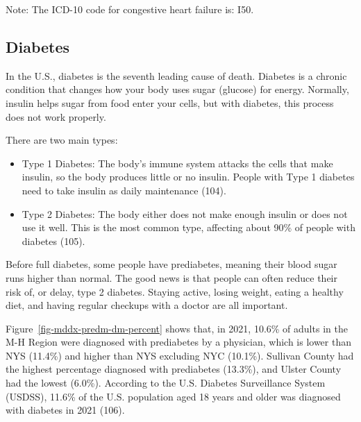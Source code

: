 \documentclass[
  english,
  letterpaper,
]{report}
\providecommand{\tightlist}{%
  \setlength{\itemsep}{0pt}\setlength{\parskip}{0pt}}
\begin{document}
\begin{tcolorbox}[enhanced jigsaw, breakable, leftrule=.75mm, title=\textcolor{quarto-callout-note-color}{\faInfo}\hspace{0.5em}{Note}, bottomrule=.15mm, opacityback=0, left=2mm, colback=white, bottomtitle=1mm, coltitle=black, colbacktitle=quarto-callout-note-color!10!white, colframe=quarto-callout-note-color-frame, opacitybacktitle=0.6, toptitle=1mm, titlerule=0mm, arc=.35mm, rightrule=.15mm, toprule=.15mm]

Note: The ICD-10 code for congestive heart failure is: I50.

\end{tcolorbox}

\subsection{Diabetes}\label{diabetes}

In the U.S., diabetes is the seventh leading cause of death. Diabetes is
a chronic condition that changes how your body uses sugar (glucose) for
energy. Normally, insulin helps sugar from food enter your cells, but
with diabetes, this process does not work properly.

There are two main types:

\begin{itemize}
\tightlist
\item
  Type 1 Diabetes: The body's immune system attacks the cells that make
  insulin, so the body produces little or no insulin. People with Type 1
  diabetes need to take insulin as daily maintenance (104).
\item
  Type 2 Diabetes: The body either does not make enough insulin or does
  not use it well. This is the most common type, affecting about 90\% of
  people with diabetes (105).
\end{itemize}

Before full diabetes, some people have prediabetes, meaning their blood
sugar runs higher than normal. The good news is that people can often
reduce their risk of, or delay, type 2 diabetes. Staying active, losing
weight, eating a healthy diet, and having regular checkups with a doctor
are all important.

Figure~\ref{fig-mddx-predm-dm-percent} shows that, in 2021, 10.6\% of
adults in the M-H Region were diagnosed with prediabetes by a physician,
which is lower than NYS (11.4\%) and higher than NYS excluding NYC
(10.1\%). Sullivan County had the highest percentage diagnosed with
prediabetes (13.3\%), and Ulster County had the lowest (6.0\%).
According to the U.S. Diabetes Surveillance System (USDSS), 11.6\% of
the U.S. population aged 18 years and older was diagnosed with diabetes
in 2021 (106).
\end{document}
